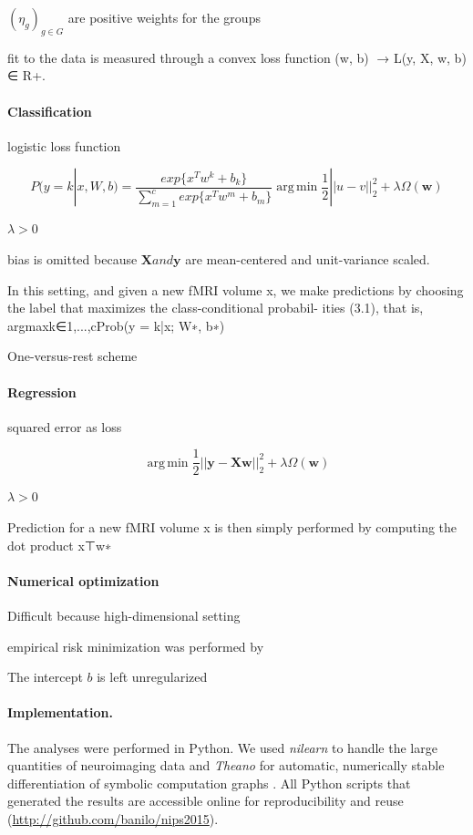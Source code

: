 \documentclass{article} %
\DeclareMathOperator*{\argmin}{arg\,min}
\begin{document}
$(\eta_g)_{g \in G}$ are positive weights for the groups


fit to the data is measured through
a convex loss function (w, b) 􏰀→ L(y, X, w, b) ∈ R+. 


\paragraph{Classification}

logistic loss function

\begin{equation}
  P(y=k|x, W, b) = \frac{exp\{x^Tw^k + b_k\}}{\sum_{m=1}^cexp\{x^Tw^m + b_m\}}
  \argmin \frac{1}{2}||u-v||_2^2 + \lambda\Omega(\mathbf{w})
\end{equation}

$\lambda > 0$

bias is omitted because $\mathbf{X} and \mathbf{y}$
are mean-centered and unit-variance scaled.

In this setting, and given a new fMRI volume x,
we make predictions by choosing the label that maximizes
the class-conditional probabil- ities (3.1), that is, argmaxk∈{1,...,c}Prob(y = k|x; W∗, b∗)

One-versus-rest scheme


\paragraph{Regression}

squared error as loss

\begin{equation}
  \argmin \frac{1}{2}||\mathbf{y - Xw}||_2^2 + \lambda\Omega(\mathbf{w})
\end{equation}

$\lambda > 0$

Prediction for a new fMRI volume x is then simply performed by computing
the dot product x⊤w∗

\paragraph{Numerical optimization}

Difficult because high-dimensional setting

empirical risk minimization was performed by


The intercept $b$ is left unregularized





\paragraph{Implementation.}
The analyses were performed in Python.
We used \textit{nilearn} to handle
the large quantities of neuroimaging data 
\cite{abrah14}
and
\textit{Theano} for automatic, numerically stable
differentiation of symbolic computation graphs
\cite{bastien2012theano, bergstra2010theano}.
All Python scripts that generated the results are
accessible online for reproducibility and reuse
(\url{http://github.com/banilo/nips2015}).
  
\end{document}
